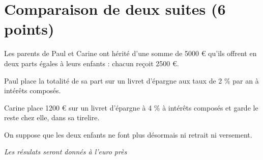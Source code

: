 \section{Comparaison de deux suites (6 points)}

Les parents de Paul et Carine ont hérité d'une somme de \num{5000} € qu'ils offrent en deux parts égales à leurs enfants : chacun reçoit \num{2500} €.

Paul place la totalité de sa part sur un livret d'épargne aux taux de 2 \% par an à intérêts composés.

Carine place \num{1200} € sur un livret d'épargne à 4 \% à intérêts composés et garde le reste chez elle, dans sa tirelire.

On suppose que les deux enfants ne font plus désormais ni retrait ni versement.

\textit{Les résulats seront donnés à l'euro près}

